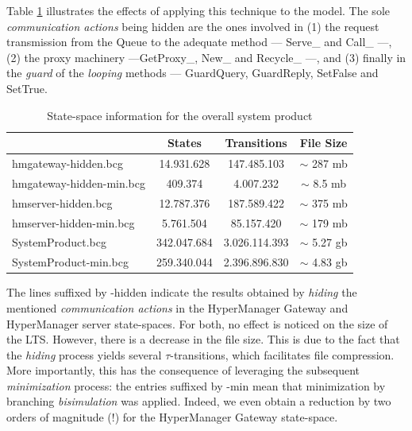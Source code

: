 	Table \ref{tab:modelSP} illustrates the effects of applying this technique to the model. The sole
	\textit{communication actions} being hidden are the ones involved in (1) the request transmission
	from the \textsf{Queue} to the adequate method --- \textsf{Serve\_} and \textsf{Call\_} ---, 
	(2) the proxy machinery ---\textsf{GetProxy\_}, \textsf{New\_} and \textsf{Recycle\_} ---, 
	and (3) finally in the \textit{guard} of the \textit{looping} methods --- \textsf{GuardQuery},
	\textsf{GuardReply}, \textsf{SetFalse} and \textsf{SetTrue}. 
	

\begin{table}[H]
\begin{center}
\begin{tabular}{| l | c | c | c |}
\hline
                             &  \textbf{States} & \textbf{Transitions} & \textbf{File Size} \\
\hline
   \textsf{hmgateway-hidden.bcg}           & 14.931.628  & 147.485.103  &  $\sim$  287 mb\\
   \textsf{hmgateway-hidden-min.bcg}   &   409.374      & 4.007.232     &  $\sim$  8.5 mb\\
  \hline
   \textsf{hmserver-hidden.bcg}           &  12.787.376    & 187.589.422    &   $\sim$  375 mb\\
  \textsf{hmserver-hidden-min.bcg}   &      5.761.504 &  85.157.420   &   $\sim$  179 mb \\
  \hline
  \textsf{SystemProduct.bcg}                                &  342.047.684  & 3.026.114.393 &  $\sim$  5.27 gb\\
  \textsf{SystemProduct-min.bcg}   &  259.340.044  &  2.396.896.830  &  $\sim$  4.83 gb\\
 \hline
\end{tabular}
\end{center}
\caption{State-space information for the overall system product}
\label{tab:modelSP}
\end{table}

		The lines suffixed by \textsf{-hidden} indicate the results obtained by \textit{hiding}
		the mentioned \textit{communication actions} in the \textsf{HyperManager Gateway}
		and \textsf{HyperManager server} state-spaces. For both, no effect is noticed on the 
		size of the \ac{LTS}. However,
		there is a decrease in the file size. This is due to the fact that the \textit{hiding} process
		yields several $\tau$-transitions, which facilitates file compression. More importantly, this 
		has the consequence of leveraging the subsequent \textit{minimization} process:
		the entries suffixed by \textsf{-min} mean that minimization by branching \textit{bisimulation} 
		was applied.	 Indeed, we even obtain a reduction by two orders of magnitude (!) for the 
		\textsf{HyperManager Gateway} state-space. 
		
